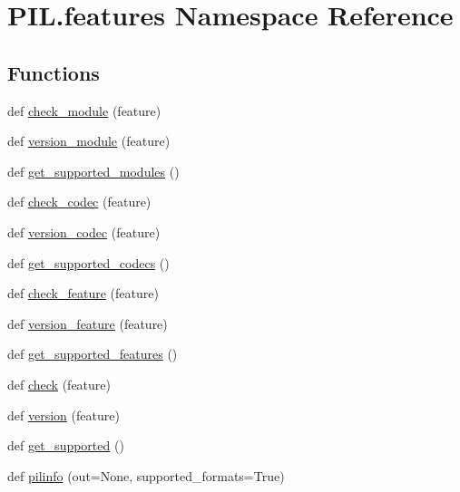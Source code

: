 \hypertarget{namespacePIL_1_1features}{}\section{P\+I\+L.\+features Namespace Reference}
\label{namespacePIL_1_1features}
\subsection*{Functions}
\begin{DoxyCompactItemize}
\item 
def \hyperlink{namespacePIL_1_1features_a433b9d375d445e4b537e4fdd9d266172}{check\+\_\+module} (feature)
\item 
def \hyperlink{namespacePIL_1_1features_ad80ee59b0afe3375a4d3ecfa64a44371}{version\+\_\+module} (feature)
\item 
def \hyperlink{namespacePIL_1_1features_a479ecf59adbc4b7927878afa7f146b48}{get\+\_\+supported\+\_\+modules} ()
\item 
def \hyperlink{namespacePIL_1_1features_aec3de1af903a33b7eb2578a70b2a9411}{check\+\_\+codec} (feature)
\item 
def \hyperlink{namespacePIL_1_1features_a2e27a0a94079654ce3cb41cd1df05468}{version\+\_\+codec} (feature)
\item 
def \hyperlink{namespacePIL_1_1features_adf11b3cf60d59d7d58487d6864bc28a6}{get\+\_\+supported\+\_\+codecs} ()
\item 
def \hyperlink{namespacePIL_1_1features_aa770cfc9e1bbd82b811d3509601bac7a}{check\+\_\+feature} (feature)
\item 
def \hyperlink{namespacePIL_1_1features_a5992f4ca5ff86edcb46bb407e543fbe6}{version\+\_\+feature} (feature)
\item 
def \hyperlink{namespacePIL_1_1features_a5685e2e0e76d072df197c5fffb2ff9d2}{get\+\_\+supported\+\_\+features} ()
\item 
def \hyperlink{namespacePIL_1_1features_a72161dd073e2e79538e58ce554a9dae5}{check} (feature)
\item 
def \hyperlink{namespacePIL_1_1features_aa4315ad39e502ab0c7d72dc1055e53a8}{version} (feature)
\item 
def \hyperlink{namespacePIL_1_1features_aa5e618116b48b46ffc6a6e0640a353e1}{get\+\_\+supported} ()
\item 
def \hyperlink{namespacePIL_1_1features_aa8419d7f72fa0bf7f764d8d7dba19443}{pilinfo} (out=None, supported\+\_\+formats=True)
\end{DoxyCompactItemize}
